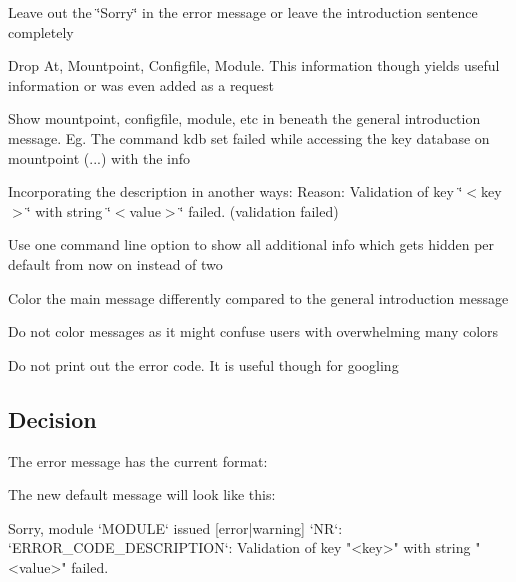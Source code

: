 \begin{DoxyItemize}
\item Leave out the \char`\"{}\+Sorry\char`\"{} in the error message or leave the introduction sentence completely
\item Drop {\ttfamily At}, {\ttfamily Mountpoint}, {\ttfamily Configfile}, {\ttfamily Module}. This information though yields useful information or was even added as a request
\item Show mountpoint, configfile, module, etc in beneath the general introduction message. Eg. {\ttfamily The command kdb set failed while accessing the key database on mountpoint (...) with the info}
\item Incorporating the description in another ways\+: {\ttfamily Reason\+: Validation of key \char`\"{}$<$key$>$\char`\"{} with string \char`\"{}$<$value$>$\char`\"{} failed. (validation failed)}
\item Use one command line option to show all additional info which gets hidden per default from now on instead of two
\item Color the main message differently compared to the general introduction message
\item Do not color messages as it might confuse users with overwhelming many colors
\item Do not print out the error code. It is useful though for googling
\end{DoxyItemize}

\subsection*{Decision}

The error message has the current format\+:




The new default message will look like this\+:


\begin{DoxyCode}
Sorry, module `MODULE` issued [error|warning] `NR`:
`ERROR\_CODE\_DESCRIPTION`: Validation of key "<key>" with string "<value>" failed.
\end{DoxyCode}


